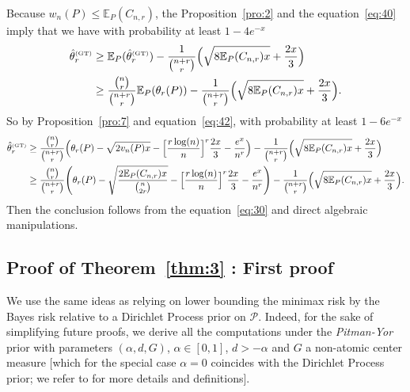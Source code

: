 \documentclass{article}
\newcommand{\1}{\boldsymbol{1}}
\newcommand{\EE}{\mathbb{E}}
\theoremstyle{plain}
\begin{document}
Because $w_n(P) \leq \EE_P(C_{n,r})$, the Proposition~\ref{pro:2} and the equation~\eqref{eq:40} imply that we have with probability at least $1 - 4e^{-x}$
\begin{align*}
  \hat{\theta}_r^{\text{\tiny{(GT)}}}%
  &\geq \EE_P(\hat{\theta}_r^{\text{\tiny{(GT)}}}) - \frac{1}{\binom{n+r}{r}}\Big(\sqrt{8\EE_P(C_{n,r})x} + \frac{2x}{3}\Big)\\
  &\geq \frac{\binom{n}{r}}{\binom{n+r}{r}}\EE_P(\theta_r(P)) - \frac{1}{\binom{n+r}{r}}\Big(\sqrt{8\EE_P(C_{n,r})x} + \frac{2x}{3}\Big).
\end{align*}
So by Proposition~\ref{pro:7} and equation~\eqref{eq:42}, with probability at least $1 - 6e^{-x}$
\begin{align*}
  \hat{\theta}_r^{\text{\tiny{(GT)}}}%
  &\geq \frac{\binom{n}{r}}{\binom{n+r}{r}}\Big(\theta_r(P) - \sqrt{2v_n(P)x} - \Big[\frac{r\log(n)}{n} \Big]^r \frac{2x}{3} - \frac{e^x}{n^r} \Big) - \frac{1}{\binom{n+r}{r}}\Big(\sqrt{8\EE_P(C_{n,r})x} + \frac{2x}{3}\Big)\\
  &\geq \frac{\binom{n}{r}}{\binom{n+r}{r}}\Bigg(\theta_r(P) - \sqrt{\frac{2 \EE_P(C_{n,r}) x}{\binom{n}{2r}}} - \Big[\frac{r\log(n)}{n} \Big]^r \frac{2x}{3} - \frac{e^x}{n^r} \Bigg) - \frac{1}{\binom{n+r}{r}}\Big(\sqrt{8\EE_P(C_{n,r})x} + \frac{2x}{3}\Big).
\end{align*}
Then the conclusion follows from the equation~\eqref{eq:30} and direct algebraic manipulations.



\subsection{Proof of Theorem~\ref{thm:3} : First proof}
\label{sec:proof-theor-refthm:3}

We use the same ideas as \cite{Fad(18)} relying on lower bounding the minimax risk by the Bayes risk relative to a Dirichlet Process prior on $\mathcal{P}$. Indeed, for the sake of simplifying future proofs, we derive all the computations under the \textit{Pitman-Yor} prior with parameters $(\alpha,d,G)$, $\alpha \in [0,1]$, $d>-\alpha$ and $G$ a non-atomic center measure [which for the special case $\alpha=0$ coincides with the Dirichlet Process prior; we refer to \cite[Section~14.4]{Gho(17)} for more details and definitions].
\end{document}
